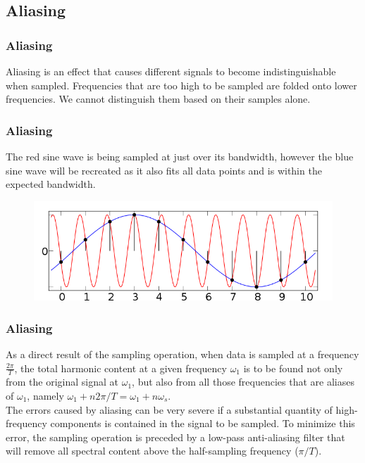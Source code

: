 \subsection{Aliasing}

\begin{frame}
	\frametitle{Aliasing}
	\begin{definition}
	Aliasing is	an effect that causes different signals to become indistinguishable when sampled. Frequencies that are too high to be sampled are folded onto lower frequencies. We cannot distinguish them based on their samples alone.
	\end{definition}
\end{frame}

\begin{frame}
	\frametitle{Aliasing}
	\begin{example}
	The red sine wave is being sampled at just over its bandwidth, however the blue sine wave will be recreated as it also fits all data points and is within the expected bandwidth.
	\vspace{-0.7em}
	\begin{figure}
		\includegraphics[width=1\linewidth]{aliasing}
	\end{figure}
	\end{example}
\end{frame}

\begin{frame}
	\frametitle{Aliasing}
	As a direct result of the sampling operation, when data is sampled at a frequency $\frac{2\pi}{T}$, the total harmonic content at a given frequency $\omega_1$ is to be found not only from the original signal at $\omega_1$, but also from all those frequencies that are aliases of $\omega_1$, namely $\omega_1 + n2\pi/T = \omega_1+n\omega_s$.\\
	\vspace{1em}
	The errors caused by aliasing can be very severe if a substantial quantity of high-frequency components is contained in the signal to be sampled. To minimize this error, the sampling operation is preceded by a low-pass anti-aliasing filter that will remove all spectral content above the half-sampling frequency ($\pi/T$).
\end{frame}

